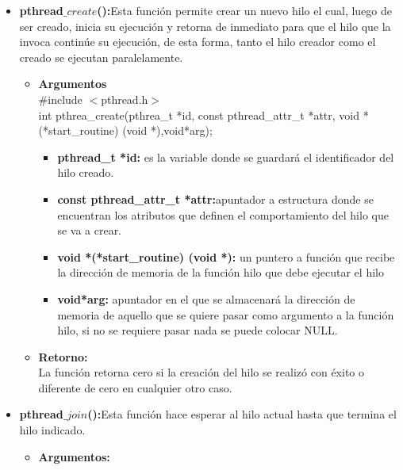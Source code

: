 \documentclass[12pt]{article}
\begin{document}
\begin{enumerate}
    \begin{itemize}
            \item \textbf{pthread$\_create$():}Esta función permite crear un nuevo hilo el cual, luego de ser creado, inicia su ejecución y retorna de inmediato para que el hilo que la invoca continúe su ejecución, de esta forma, tanto el hilo creador como el creado se ejecutan paralelamente.\\
            \begin{itemize}
                \item \textbf{Argumentos}\\
                #include $<$pthread.h$>$\\
                int pthrea\_create(pthrea\_t *id, const pthread\_attr\_t *attr, void *(*start\_routine) (void *),void*arg);\\
                \begin{itemize}
                    \item \textbf{pthread\_t *id:} es la variable donde se guardará el identificador del hilo creado.
                    \item \textbf{const pthread\_attr\_t *attr:}apuntador a estructura donde se encuentran los atributos que definen el comportamiento del hilo que se va a crear.
                    \item \textbf{void *(*start\_routine) (void *):} un puntero a función que recibe la dirección de memoria de la función hilo que debe ejecutar el hilo
                    \item \textbf{void*arg:} apuntador en el que se almacenará la dirección de memoria de aquello que se quiere pasar como argumento a la función hilo, si no se requiere pasar nada se puede colocar NULL. 
                \end{itemize}
                \item \textbf{Retorno:} \\
                La función retorna cero si la creación del hilo se realizó con éxito o diferente de cero en cualquier otro caso.
            \end{itemize}
            \newpage
            \item \textbf{pthread$\_join$():}Esta función hace esperar al hilo actual hasta que termina el hilo indicado.\\
            \begin{itemize}
                \item \textbf{Argumentos:}\\

\end{itemize}
\end{itemize}
\end{enumerate}
\end{document}
